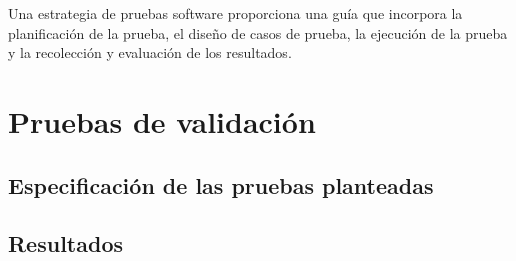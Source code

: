 Una estrategia de pruebas software proporciona una guía que incorpora la planificación de la prueba, el diseño de casos de prueba, la ejecución de la prueba y la recolección y evaluación de los resultados.






\section{Pruebas de validación}

\subsection{Especificación de las pruebas planteadas}

\subsection{Resultados}